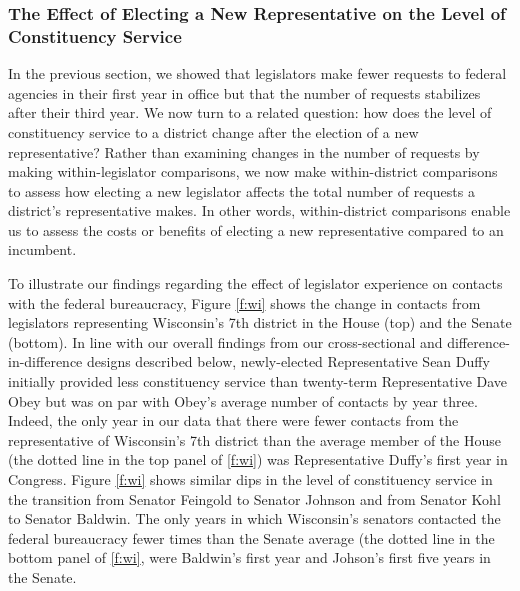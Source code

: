 \documentclass[12pt]{article}
\begin{document}
{\subsubsection{The Effect of Electing a New Representative on the Level of Constituency Service}\label{s:tenure_dist}

In the previous section, we showed that legislators make fewer requests to federal agencies in their first year in office but that the number of requests stabilizes after their third year. We now turn to a related question: how does the level of constituency service to a district change after the election of a new representative? Rather than examining changes in the number of requests by making within-legislator comparisons, we now make within-district comparisons to assess how electing a new legislator affects the total number of requests a district's representative makes. In other words, within-district comparisons enable us to assess the costs or benefits of electing a new representative compared to an incumbent.%


To illustrate our findings regarding the effect of legislator experience on contacts with the federal bureaucracy, Figure \ref{f:wi} shows the change in contacts from legislators representing Wisconsin's 7th district in the House (top) and the Senate (bottom). 
In line with our overall findings from our cross-sectional and difference-in-difference designs described below, newly-elected Representative Sean Duffy initially provided less constituency service than twenty-term Representative Dave Obey but was on par with Obey's average number of contacts by year three. Indeed, the only year in our data that there were fewer contacts from the representative of Wisconsin's 7th district than the average member of the House (the dotted line in the top panel of \ref{f:wi}) was Representative Duffy's first year in Congress. Figure \ref{f:wi} shows similar dips in the level of constituency service in the transition from Senator Feingold to Senator Johnson and from Senator Kohl to Senator Baldwin. The only years in which Wisconsin's senators contacted the federal bureaucracy fewer times than the Senate average (the dotted line in the bottom panel of \ref{f:wi}, were Baldwin's first year and Johson's first five years in the Senate. 

}
\end{document}
